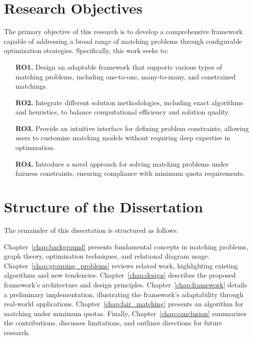 \section{Research Objectives} 

The primary objective of this research is to develop a comprehensive framework capable of addressing a broad range of matching problems through configurable optimization strategies. Specifically, this work seeks to:

\begin{itemize}
    \item[\textbf{RO1.}]\label{ro1} Design an adaptable framework that supports various types of matching problems, including one-to-one, many-to-many, and constrained matchings.
    
    \item[\textbf{RO2.}]\label{ro2} Integrate different solution methodologies, including exact algorithms and heuristics, to balance computational efficiency and solution quality.
    
    \item[\textbf{RO3.}]\label{ro3} Provide an intuitive interface for defining problem constraints, allowing users to customize matching models without requiring deep expertise in optimization.

    \item[\textbf{RO4.}]\label{ro4} Introduce a novel approach for solving matching problems under fairness constraints, ensuring compliance with minimum quota requirements.
\end{itemize}

\section{Structure of the Dissertation}
The remainder of this dissertation is structured as follows.

Chapter~\ref{chap:background} presents fundamental concepts in matching problems, graph theory, optimization techniques, and relational diagram usage.
Chapter~\ref{chap:grouping_problems} reviews related work, highlighting existing algorithms and new tendencies.
Chapter~\ref{chap:design} describes the proposed framework’s architecture and design principles.
Chapter~\ref{chap:framework} details a preliminary implementation, illustrating the framework’s adaptability through real-world applications.
Chapter~\ref{chap:fair_matching} presents an algorithm for matching under minimum quotas.
Finally, Chapter~\ref{chap:conclusion} summarizes the contributions, discusses limitations, and outlines directions for future research.